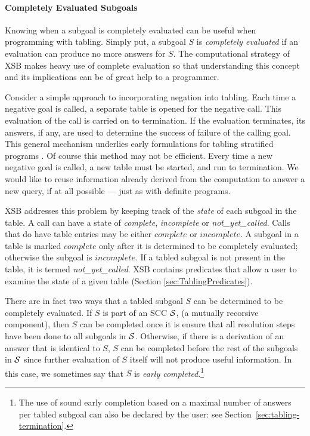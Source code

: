 \paragraph*{Completely Evaluated Subgoals}

Knowing when a subgoal is completely evaluated can be useful when
programming with tabling.  Simply put, a subgoal $S$ is {\em
  completely evaluated} if an evaluation can produce no more answers
for $S$\@.  The computational strategy of XSB makes heavy use of
complete evaluation so that understanding this concept and its
implications can be of great help to a programmer.

Consider a simple approach to incorporating negation into tabling.
Each time a negative goal is called, a separate table is opened for
the negative call.  This evaluation of the call is carried on to
termination.  If the evaluation terminates, its answers, if any, are
used to determine the success of failure of the calling goal.  This
general mechanism underlies early formulations for tabling stratified
programs \cite{KeTo88,Seki89}.  Of course this method may not be
efficient.  Every time a new negative goal is called, a new table must
be started, and run to termination.  We would like to reuse information
already derived from the computation to answer a new query, if at all
possible --- just as with definite programs.

XSB addresses this problem by keeping track of the {\em state} of each
subgoal in the table.  A call can have a state of {\em complete}, {\em
incomplete} or {\em not\_yet\_called}.  
Calls that do have table entries may be either $complete$ or
$incomplete$.  A subgoal in a table is marked $complete$ only after it
is determined to be completely evaluated; otherwise the subgoal is
$incomplete$.  If a tabled subgoal is not present in the table, it is
termed {\em not\_yet\_called}.  XSB contains predicates that allow a
user to examine the state of a given table (Section
\ref{sec:TablingPredicates}).

 There are in fact two
ways that a tabled subgoal $S$ can be determined to be completely
evaluated.  If $S$ is part of an SCC ${\cal S}$, (a mutually recorsive
component), then $S$ can be completed once it is ensure that all
resolution steps have been done to all subgoals in ${\cal S}$.  Otherwise,
if there is a derivation of an answer that is identical to $S$, $S$
can be completed before the rest of the subgoals in ${\cal S}$ since
further evaluation of $S$ itself will not produce useful information.
In this case, we sometimes say that $S$ is {\em early
  completed}.\footnote{The use of sound early completion based on a
  maximal number of answers per tabled subgoal can also be declared by
  the user: see Section~\ref{sec:tabling-termination}.}


